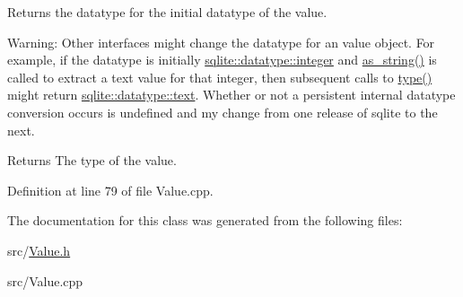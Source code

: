 Returns the datatype for the initial datatype of the value. 

Warning\-: Other interfaces might change the datatype for an value object. For example, if the datatype is initially \hyperlink{a00038_a7467e5cdd32bbf7fce35aced88682dc0a157db7df530023575515d366c9b672e8}{sqlite\-::datatype\-::integer} and \hyperlink{a00015_a6ce81cd7d007013cdc4ac5103ffa76f1}{as\-\_\-string()} is called to extract a text value for that integer, then subsequent calls to \hyperlink{a00015_a1dbe99607518010c9fd134b0816bb451}{type()} might return \hyperlink{a00038_a7467e5cdd32bbf7fce35aced88682dc0a1cb251ec0d568de6a929b520c4aed8d1}{sqlite\-::datatype\-::text}. Whether or not a persistent internal datatype conversion occurs is undefined and my change from one release of sqlite to the next. \begin{DoxyReturn}{Returns}
The type of the value. 
\end{DoxyReturn}


Definition at line 79 of file Value.\-cpp.



The documentation for this class was generated from the following files\-:\begin{DoxyCompactItemize}
\item 
src/\hyperlink{a00037}{Value.\-h}\item 
src/Value.\-cpp\end{DoxyCompactItemize}
